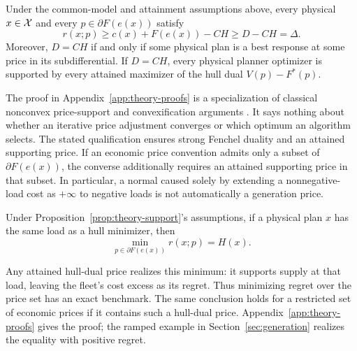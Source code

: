 \begin{proposition}\label{prop:theory-support}
Under the common-model and attainment assumptions above, every physical
$x\in\mathcal X$ and every $p\in\partial F(e(x))$ satisfy
\begin{equation}\label{eq:theory-support}
 r(x;p)\geq c(x)+F(e(x))-CH\geq D-CH=\Delta.
\end{equation}
Moreover, $D=CH$ if and only if some physical plan is a best response at
some price in its subdifferential.  If $D=CH$, every physical planner
optimizer is supported by every attained maximizer of the hull dual
$V(p)-F^*(p)$.
\end{proposition}

The proof in Appendix~\ref{app:theory-proofs} is a specialization of classical
nonconvex price-support and convexification arguments
\citep{starr1969,oneill2005,gribikHoganPope2007,huaBaldick2017,schiro2016}.
It says nothing about whether an iterative price adjustment converges or
which optimum an algorithm selects.  The stated qualification
ensures strong Fenchel duality and an attained supporting price.  If an
economic price convention admits only a subset of $\partial F(e(x))$, the
converse additionally requires an attained supporting price in that subset.
In particular, a normal caused solely by extending a nonnegative-load cost
as $+\infty$ to negative loads is not automatically a generation price.

\begin{corollary}\label{cor:best-price}
Under Proposition~\ref{prop:theory-support}'s assumptions, if a physical plan
$x$ has the same load as a hull minimizer, then
\begin{equation}\label{eq:best-price}
 \min_{p\in\partial F(e(x))}r(x;p)=H(x).
\end{equation}
\end{corollary}
Any attained hull-dual price realizes this minimum: it supports supply at
that load, leaving the fleet's cost excess as its regret. Thus minimizing
regret over the price set has an exact benchmark. The same conclusion holds
for a restricted set of economic prices if it contains such a hull-dual
price. Appendix~\ref{app:theory-proofs} gives the proof; the ramped example
in Section~\ref{sec:generation} realizes the equality with positive regret.


